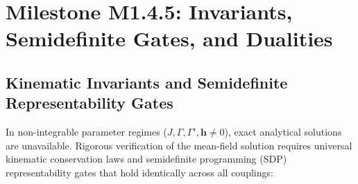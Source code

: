 \chapter{Milestone M1.4.5: Invariants, Semidefinite Gates, and Dualities}
\label{ch:m1_4_5}

\section{Kinematic Invariants and Semidefinite Representability Gates}
\label{sec:m1_4_5_kinematic_gates}
In non-integrable parameter regimes ($J, \Gamma, \Gamma', \mathbf{h} \ne 0$), exact analytical solutions are unavailable. Rigorous verification of the mean-field solution requires universal kinematic conservation laws and semidefinite programming (SDP) representability gates that hold identically across all couplings:

